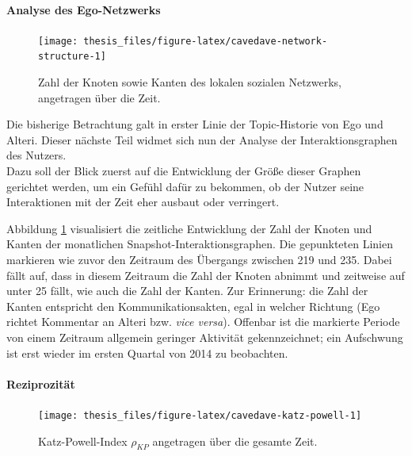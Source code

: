 \documentclass[11pt,a4paper,twoside]{article}
\let\oldpar\paragraph
\renewcommand{\paragraph}{\oldpar*}
\begin{document}
\hypertarget{analyse-des-ego-netzwerks}{%
\paragraph{Analyse des Ego-Netzwerks}\label{analyse-des-ego-netzwerks}}




\begin{figure}

{\centering \texttt{[image: thesis\_files/figure-latex/cavedave-network-structure-1]} 

}

\caption{Zahl der Knoten sowie Kanten des
lokalen sozialen Netzwerks, angetragen über die Zeit.}\label{fig:cavedave-network-structure}
\end{figure}

Die bisherige Betrachtung galt in erster Linie der Topic-Historie von
Ego und Alteri. Dieser nächste Teil widmet sich nun der Analyse der
Interaktionsgraphen des Nutzers.\\
Dazu soll der Blick zuerst auf die Entwicklung der Größe dieser Graphen
gerichtet werden, um ein Gefühl dafür zu bekommen, ob der Nutzer seine
Interaktionen mit der Zeit eher ausbaut oder verringert.

Abbildung \ref{fig:cavedave-network-structure} visualisiert die
zeitliche Entwicklung der Zahl der Knoten und Kanten der monatlichen
Snapshot-Interaktionsgraphen. Die gepunkteten Linien markieren wie zuvor
den Zeitraum des Übergangs zwischen 219 und 235. Dabei fällt auf, dass
in diesem Zeitraum die Zahl der Knoten abnimmt und zeitweise auf unter
25 fällt, wie auch die Zahl der Kanten. Zur Erinnerung: die Zahl der
Kanten entspricht den Kommunikationsakten, egal in welcher Richtung (Ego
richtet Kommentar an Alteri bzw. \emph{vice versa}). Offenbar ist die
markierte Periode von einem Zeitraum allgemein geringer Aktivität
gekennzeichnet; ein Aufschwung ist erst wieder im ersten Quartal von
2014 zu beobachten.

\hypertarget{reziprozitat-2}{%
\paragraph{Reziprozität}\label{reziprozitat-2}}




\begin{figure}

{\centering \texttt{[image: thesis\_files/figure-latex/cavedave-katz-powell-1]} 

}

\caption{Katz-Powell-Index \(\rho_{KP}\) angetragen
über die gesamte Zeit.}\label{fig:cavedave-katz-powell}
\end{figure}
\end{document}
